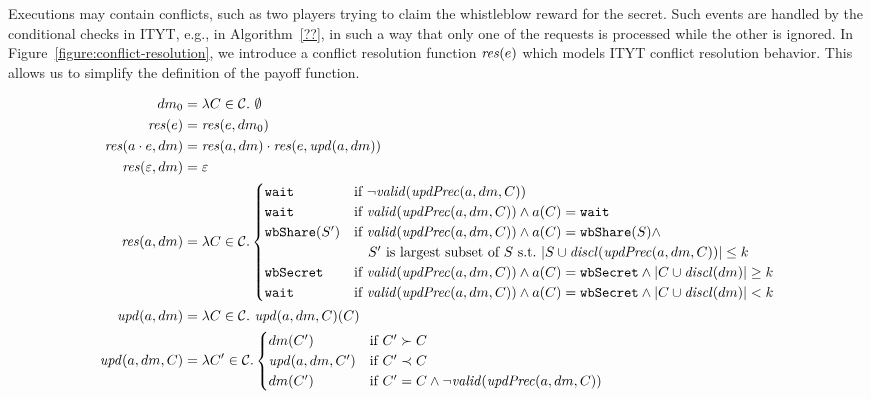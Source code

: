 %
Executions may contain conflicts, such as two players trying to claim the whistleblow reward for the secret.
%
Such events are handled by the conditional checks in ITYT, e.g., in Algorithm~\ref{??}, in such a way that only one of the requests is processed while the other is ignored.
%
In Figure~\ref{figure:conflict-resolution}, we introduce a conflict resolution function $\mathit{res}(e)$ which models ITYT conflict resolution behavior. 
%
This allows us to simplify the definition of the payoff function.



\begin{figure*}
\begin{align*}
	dm_0 &= \lambda C \in \coalitionSchema.\ \emptyset\\
	\conflict{e} &= \conflictExec{e}{dm_0}\\
	\conflictExec{a \concat e}{dm} &= \conflictAction{a}{dm} \concat \conflictExec{e}{\updateDM{a}{dm}}\\
	\conflictExec{\emptysequence}{dm} &= \emptysequence\\
	\conflictAction{a}{dm} & =  \lambda C \in \coalitionSchema.
	\begin{cases}
		\wait & \text{if}\ \neg \valid{\updPrec{a}{dm}{C}}\\
		\wait & \text{if}\ \valid{\updPrec{a}{dm}{C}} \wedge a(C) = \wait \\
		\wShare{S'} & \text{if}\ \valid{\updPrec{a}{dm}{C}} \wedge a(C) = \wShare{S} \wedge \\
		& \quad S'\ \text{is largest subset of}\ S\ \text{s.t.}\ |S \cup \disclosed{\updPrec{a}{dm}{C}}| \leq k \\
		\wSecret & \text{if}\ \valid{\updPrec{a}{dm}{C}} \wedge a(C) = \wSecret \wedge |C \cup \disclosed{dm}| \geq k \\
		\wait & \text{if}\ \valid{\updPrec{a}{dm}{C}} \wedge a(C) = \wSecret \wedge |C \cup \disclosed{dm}| < k \\
	\end{cases}
	\\
	\updateDM{a}{dm} & = \lambda C \in \coalitionSchema.\ \partialUpdateDM{a}{dm}{C}(C) \\
	\partialUpdateDM{a}{dm}{C}& = \lambda C' \in \coalitionSchema.
	\begin{cases}
 		dm(C') & \text{if}\ C' \succ C \\
 		\partialUpdateDM{a}{dm}{C'} & \text{if}\ C' \prec C\\
 		dm(C') &  \text{if}\ C' = C \wedge \neg \valid{\updPrec{a}{dm}{C}}  \\	

\end{cases}
\end{align*}
\end{figure*}
